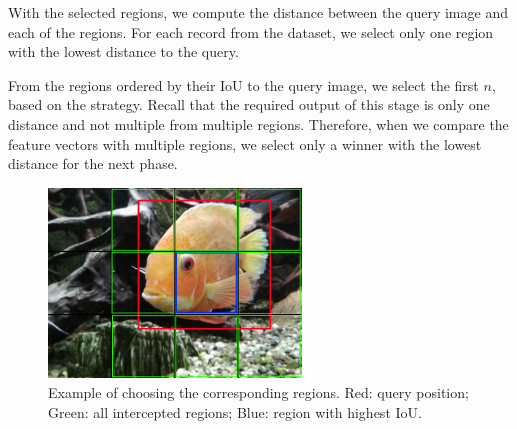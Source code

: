 With the selected regions, we compute the distance between the query image and each of the regions. For each record from the dataset, we select only one region with the lowest distance to the query.

From the regions ordered by their IoU to the query image, we select the first $n$, based on the strategy. Recall that the required output of this stage is only one distance and not multiple from multiple regions. Therefore, when we compare the feature vectors with multiple regions, we select only a winner with the lowest distance for the next phase. 


\begin{figure}
\centering
\includegraphics[width=0.6\textwidth]{img/fish_grid_regions}
\caption{Example of choosing the corresponding regions. Red: query position; Green: all intercepted regions; Blue: region with highest IoU.}
\label{fig:fish_with_grid}
\end{figure}




